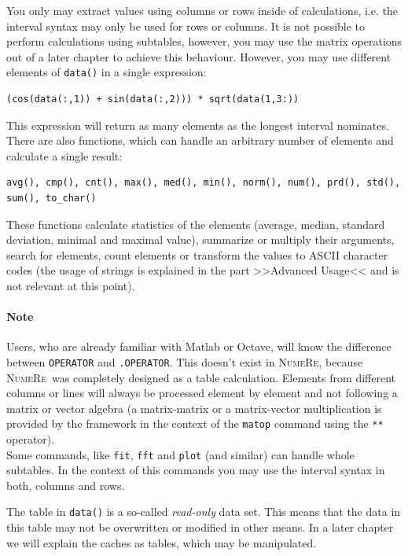 \documentclass[DIV=14,headsepline,footsepline]{scrbook}
\newcommand{\NR}{\textsc{Nu\-me\-Re}}
\begin{document}
				You only may extract values using columns or rows inside of calculations, i.e. the interval syntax may only be used for rows or columns. It is not possible to perform calculations using subtables, however, you may use the matrix operations out of a later chapter to achieve this behaviour. However, you may use different elements of \lstinline+data()+ in a single expression:
				\begin{lstlisting}
(cos(data(:,1)) + sin(data(:,2))) * sqrt(data(1,3:))
				\end{lstlisting}
				This expression will return as many elements as the longest interval nominates. There are also functions, which can handle an arbitrary number of elements and calculate a single result:
				\begin{lstlisting}
avg(), cmp(), cnt(), max(), med(), min(), norm(), num(), prd(), std(), sum(), to_char()
				\end{lstlisting}
				These functions calculate statistics of the elements (average, median, standard deviation, minimal and maximal value), summarize or multiply their arguments, search for elements, count elements or transform the values to ASCII character codes (the usage of strings is explained in the part >>Advanced Usage<< and is not relevant at this point).
				
				\paragraph{Note}
					Users, who are already familiar with Matlab or Octave, will know the difference between \lstinline+OPERATOR+ and \lstinline+.OPERATOR+. This doesn't exist in \NR, because \NR\ was completely designed as a table calculation. Elements from different columns or lines will always be processed element by element and not following a matrix or vector algebra (a matrix-matrix or a matrix-vector multiplication is provided by the framework in the context of the \lstinline+matop+ command using the \lstinline+**+ operator).\bigskip\\
				Some commands, like \lstinline+fit+, \lstinline+fft+ and \lstinline+plot+ (and similar) can handle whole subtables. In the context of this commands you may use the interval syntax in both, columns and rows.
				
				The table in \lstinline+data()+ is a so-called \emph{read-only} data set. This means that the data in this table may not be overwritten or modified in other means. In a later chapter we will explain the caches as tables, which may be manipulated.
				
\end{document}

